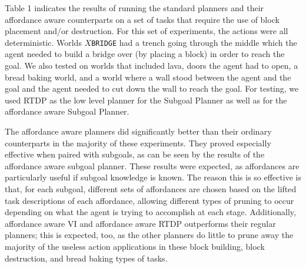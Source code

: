 \documentclass[]{article}
\begin{document}
%
%



Table 1 indicates the results of running the standard planners and their affordance
aware counterparts on a set of tasks that require the use of block placement and/or
destruction. For this set of experiments, the actions were all deterministic.
Worlds \texttt{$X$BRIDGE} had a trench going through the middle which the
agent needed to build a bridge over (by placing a block) in order to reach the goal. We also
tested on worlds that included lava, doors the agent had to open, a bread baking world, and a 
world where a wall stood between the agent and the goal and the agent needed to cut down the wall
to reach the goal. For testing, we used RTDP as the low level planner for the Subgoal Planner
as well as for the affordance aware Subgoal Planner.

The affordance aware planners did significantly better than their ordinary counterparts in the majority
of these experiments. They proved especially effective when paired with subgoals, as can be seen by the
results of the affordance aware subgoal planner. These results were expected, as affordances are particularly
useful if subgoal knowledge is known. The reason this is so effective is that, for each subgoal, different sets
of affordances are chosen based on the lifted task descriptions of each affordance, allowing different types
of pruning to occur depending on what the agent is trying to accomplish at each stage. Additionally, affordance aware VI
and affordance aware RTDP outperforms their regular planners; this is expected, too, as the other
planners do little to prune away the majority of the useless action applications in these block building,
block destruction, and bread baking types of tasks.
\end{document}
